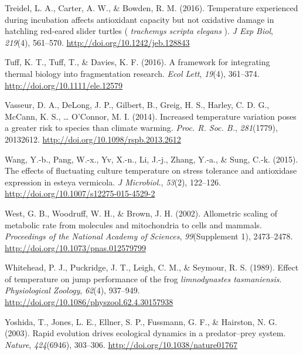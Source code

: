 \documentclass[12pt,twoside]{reedthesis}
\begin{document}
\leavevmode\hypertarget{ref-treidel_temperature_2016-1}{}%
Treidel, L. A., Carter, A. W., \& Bowden, R. M. (2016). Temperature experienced during incubation affects antioxidant capacity but not oxidative damage in hatchling red-eared slider turtles ( \emph{trachemys scripta elegans} ). \emph{J Exp Biol}, \emph{219}(4), 561--570. \url{http://doi.org/10.1242/jeb.128843}

\leavevmode\hypertarget{ref-tuff_framework_2016}{}%
Tuff, K. T., Tuff, T., \& Davies, K. F. (2016). A framework for integrating thermal biology into fragmentation research. \emph{Ecol Lett}, \emph{19}(4), 361--374. \url{http://doi.org/10.1111/ele.12579}

\leavevmode\hypertarget{ref-vasseur_increased_2014}{}%
Vasseur, D. A., DeLong, J. P., Gilbert, B., Greig, H. S., Harley, C. D. G., McCann, K. S., \ldots{} O'Connor, M. I. (2014). Increased temperature variation poses a greater risk to species than climate warming. \emph{Proc. R. Soc. B.}, \emph{281}(1779), 20132612. \url{http://doi.org/10.1098/rspb.2013.2612}

\leavevmode\hypertarget{ref-wang_effects_2015}{}%
Wang, Y.-b., Pang, W.-x., Yv, X.-n., Li, J.-j., Zhang, Y.-a., \& Sung, C.-k. (2015). The effects of fluctuating culture temperature on stress tolerance and antioxidase expression in esteya vermicola. \emph{J Microbiol.}, \emph{53}(2), 122--126. \url{http://doi.org/10.1007/s12275-015-4529-2}

\leavevmode\hypertarget{ref-west_allometric_2002}{}%
West, G. B., Woodruff, W. H., \& Brown, J. H. (2002). Allometric scaling of metabolic rate from molecules and mitochondria to cells and mammals. \emph{Proceedings of the National Academy of Sciences}, \emph{99}(Supplement 1), 2473--2478. \url{http://doi.org/10.1073/pnas.012579799}

\leavevmode\hypertarget{ref-whitehead_effect_1989}{}%
Whitehead, P. J., Puckridge, J. T., Leigh, C. M., \& Seymour, R. S. (1989). Effect of temperature on jump performance of the frog \emph{limnodynastes tasmaniensis}. \emph{Physiological Zoology}, \emph{62}(4), 937--949. \url{http://doi.org/10.1086/physzool.62.4.30157938}

\leavevmode\hypertarget{ref-yoshida_rapid_2003}{}%
Yoshida, T., Jones, L. E., Ellner, S. P., Fussmann, G. F., \& Hairston, N. G. (2003). Rapid evolution drives ecological dynamics in a predator--prey system. \emph{Nature}, \emph{424}(6946), 303--306. \url{http://doi.org/10.1038/nature01767}


\end{document}
